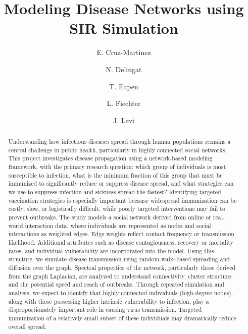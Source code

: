 \documentclass[9pt,twocolumn]{pnas-new}
\begin{document}
\title{Modeling Disease Networks using SIR Simulation}

\author[a]{E. Cruz-Martinez}
\author[a]{N. Delingat}
\author[a]{T. Eapen}
\author[a,1]{L. Fiechter}
\author[a]{J. Levi}






\begin{abstract}
Understanding how infectious diseases spread through human populations remains a central challenge in public health, particularly in highly connected social networks. This project investigates disease propagation using a network-based modeling framework, with the primary research question: which group of individuals is most susceptible to infection, what is the minimum fraction of this group that must be immunized to significantly reduce or suppress disease spread, and what strategies can we use to suppress infection and sickness spread the fastest? Identifying targeted vaccination strategies is especially important because widespread immunization can be costly, slow, or logistically difficult, while poorly targeted interventions may fail to prevent outbreaks. The study models a social network derived from online or real-world interaction data, where individuals are represented as nodes and social interactions as weighted edges. Edge weights reflect contact frequency or transmission likelihood. Additional attributes such as disease contagiousness, recovery or mortality rates, and individual vulnerability are incorporated into the model. Using this structure, we simulate disease transmission using random-walk--based spreading and diffusion over the graph. Spectral properties of the network, particularly those derived from the graph Laplacian, are analyzed to understand connectivity, cluster structure, and the potential speed and reach of outbreaks. Through repeated simulation and analysis, we expect to identify that highly connected individuals (high-degree nodes), along with those possessing higher intrinsic vulnerability to infection, play a disproportionately important role in causing virus transmission. Targeted immunization of a relatively small subset of these individuals may dramatically reduce overall spread.
\end{abstract}
\end{document}
